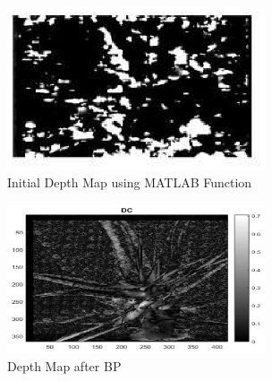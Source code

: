\begin{figure}[h]
\begin{center}
\includegraphics[width=3in]{idmalma.eps}
\caption{Initial Depth Map using MATLAB Function} \label{lined}
\end{center}
\end{figure}
\begin{figure}[h]
\begin{center}
\includegraphics[width=3in]{dmmaal.eps}
\caption{Depth Map after BP} \label{lined}
\end{center}
\end{figure}






